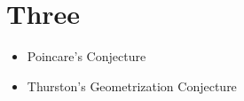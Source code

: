 \chapter*{Three}

\begin{boxTODO}{}
\begin{itemize}
    \item Poincare's Conjecture
    \item Thurston's Geometrization Conjecture
\end{itemize}
\end{boxTODO}
